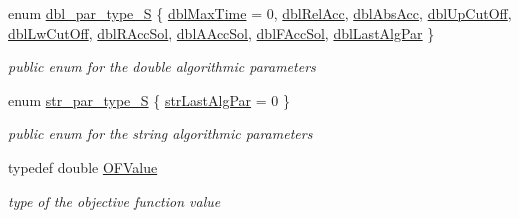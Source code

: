 \begin{Indent}
\begin{DoxyCompactItemize}
enum \mbox{\hyperlink{class_s_m_spp__di__unipi__it_1_1_solver_ace6215148d1e3c41a8844f6d692ee132}{dbl\+\_\+par\+\_\+type\+\_\+S}} \{ \newline
\mbox{\hyperlink{class_s_m_spp__di__unipi__it_1_1_solver_ace6215148d1e3c41a8844f6d692ee132acd77e71bf86e7d641a5e571a18efae5a}{dbl\+Max\+Time}} = 0, 
\mbox{\hyperlink{class_s_m_spp__di__unipi__it_1_1_solver_ace6215148d1e3c41a8844f6d692ee132a6bafebef661615217b94425419f0d8d2}{dbl\+Rel\+Acc}}, 
\mbox{\hyperlink{class_s_m_spp__di__unipi__it_1_1_solver_ace6215148d1e3c41a8844f6d692ee132aafe17e0e4a531284760badf1ad8f34d4}{dbl\+Abs\+Acc}}, 
\mbox{\hyperlink{class_s_m_spp__di__unipi__it_1_1_solver_ace6215148d1e3c41a8844f6d692ee132a22be127e17b811416b84944432a35ca5}{dbl\+Up\+Cut\+Off}}, 
\newline
\mbox{\hyperlink{class_s_m_spp__di__unipi__it_1_1_solver_ace6215148d1e3c41a8844f6d692ee132adaf90064ffac03f204c43a0adf226f58}{dbl\+Lw\+Cut\+Off}}, 
\mbox{\hyperlink{class_s_m_spp__di__unipi__it_1_1_solver_ace6215148d1e3c41a8844f6d692ee132a61bab778a6490d4bac12da31ce986528}{dbl\+R\+Acc\+Sol}}, 
\mbox{\hyperlink{class_s_m_spp__di__unipi__it_1_1_solver_ace6215148d1e3c41a8844f6d692ee132a61233350cae4834386fdc2f6b35de36d}{dbl\+A\+Acc\+Sol}}, 
\mbox{\hyperlink{class_s_m_spp__di__unipi__it_1_1_solver_ace6215148d1e3c41a8844f6d692ee132aa3e286dbe7477468d81258bd410d7ca6}{dbl\+F\+Acc\+Sol}}, 
\newline
\mbox{\hyperlink{class_s_m_spp__di__unipi__it_1_1_solver_ace6215148d1e3c41a8844f6d692ee132a644cda7f00555763dd9520f638d7874f}{dbl\+Last\+Alg\+Par}}
 \}
\begin{DoxyCompactList}\small\item\em public enum for the double algorithmic parameters \end{DoxyCompactList}\item 
enum \mbox{\hyperlink{class_s_m_spp__di__unipi__it_1_1_solver_a350eaed52c8a495f2505e5556affaa04}{str\+\_\+par\+\_\+type\+\_\+S}} \{ \mbox{\hyperlink{class_s_m_spp__di__unipi__it_1_1_solver_a350eaed52c8a495f2505e5556affaa04a70a754568a017cce62e259e96b54852b}{str\+Last\+Alg\+Par}} = 0
 \}
\begin{DoxyCompactList}\small\item\em public enum for the string algorithmic parameters \end{DoxyCompactList}\item 
typedef double \mbox{\hyperlink{class_s_m_spp__di__unipi__it_1_1_solver_ab8ce6bff9c21fdcd41e355167209301a}{O\+F\+Value}}
\begin{DoxyCompactList}\small\item\em type of the objective function value \end{DoxyCompactList}\end{DoxyCompactItemize}
\end{Indent}

